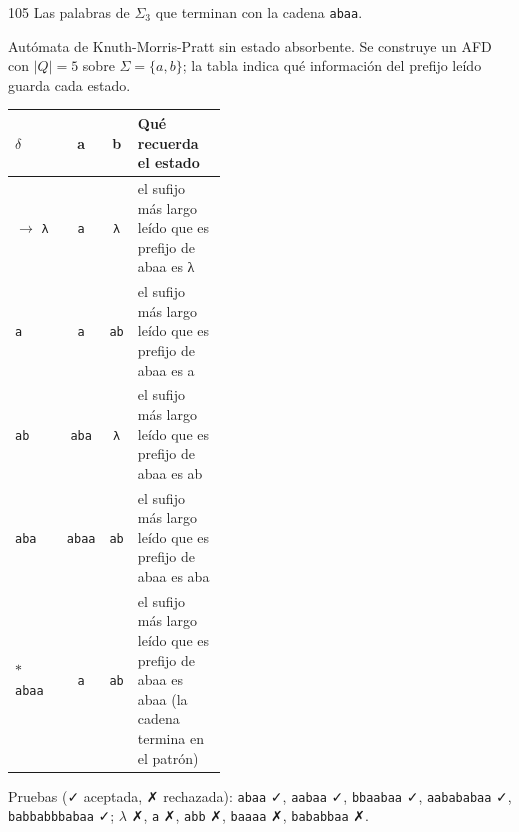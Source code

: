 \documentclass[11pt]{article}
\begin{document}
\begin{ejercicio}{105}{}
Las palabras de $\Sigma_3$ que terminan con la cadena \texttt{abaa}.
\end{ejercicio}
\proc Autómata de Knuth-Morris-Pratt sin estado absorbente. Se construye un AFD con $|Q| = 5$ sobre $\Sigma = \{a, b\}$; la tabla indica qué información del prefijo leído guarda cada estado.
\begin{center}\small\begin{tabular}{lccp{0.42\linewidth}}\toprule
$\delta$ & a & b & Qué recuerda el estado \\\midrule
$\to$ \texttt{λ} & \texttt{a} & \texttt{λ} & el sufijo más largo leído que es prefijo de abaa es λ \\
 \texttt{a} & \texttt{a} & \texttt{ab} & el sufijo más largo leído que es prefijo de abaa es a \\
 \texttt{ab} & \texttt{aba} & \texttt{λ} & el sufijo más largo leído que es prefijo de abaa es ab \\
 \texttt{aba} & \texttt{abaa} & \texttt{ab} & el sufijo más largo leído que es prefijo de abaa es aba \\
$*$ \texttt{abaa} & \texttt{a} & \texttt{ab} & el sufijo más largo leído que es prefijo de abaa es abaa (la cadena termina en el patrón) \\
\bottomrule\end{tabular}\end{center}
Pruebas (✓ aceptada, ✗ rechazada): \texttt{abaa} ✓, \texttt{aabaa} ✓, \texttt{bbaabaa} ✓, \texttt{aabababaa} ✓, \texttt{babbabbbabaa} ✓; $\lambda$ ✗, \texttt{a} ✗, \texttt{abb} ✗, \texttt{baaaa} ✗, \texttt{bababbaa} ✗.
\end{document}
